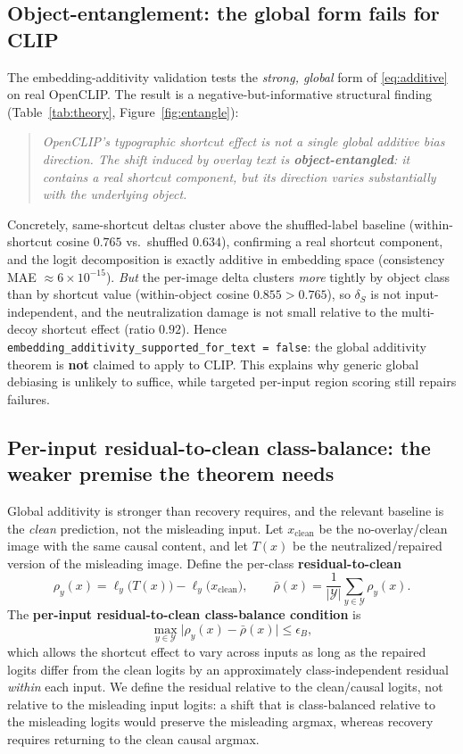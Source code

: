 \documentclass[11pt]{article}
\begin{document}
\subsection{Object-entanglement: the global form fails for CLIP}
The embedding-additivity validation tests the \emph{strong, global} form of
\eqref{eq:additive} on real OpenCLIP. The result is a negative-but-informative
structural finding (Table~\ref{tab:theory}, Figure~\ref{fig:entangle}):
\begin{quote}
\itshape OpenCLIP's typographic shortcut effect is not a single global additive bias
direction. The shift induced by overlay text is \textbf{object-entangled}: it
contains a real shortcut component, but its direction varies substantially with the
underlying object.
\end{quote}
Concretely, same-shortcut deltas cluster above the shuffled-label baseline
(within-shortcut cosine $0.765$ vs.\ shuffled $0.634$), confirming a real shortcut
component, and the logit decomposition is exactly additive in embedding space
(consistency MAE $\approx 6\times10^{-15}$). \emph{But} the per-image delta clusters
\emph{more} tightly by object class than by shortcut value (within-object cosine
$0.855 > 0.765$), so $\delta_S$ is not input-independent, and the neutralization
damage is not small relative to the multi-decoy shortcut effect (ratio $0.92$).
Hence \texttt{embedding\_additivity\_supported\_for\_text = false}: the global
additivity theorem is \textbf{not} claimed to apply to CLIP. This explains why
generic global debiasing is unlikely to suffice, while targeted per-input region
scoring still repairs failures.

\subsection{Per-input residual-to-clean class-balance: the weaker premise the theorem needs}
Global additivity is stronger than recovery requires, and the relevant baseline is
the \emph{clean} prediction, not the misleading input. Let $x_{\mathrm{clean}}$ be
the no-overlay/clean image with the same causal content, and let $T(x)$ be the
neutralized/repaired version of the misleading image. Define the per-class
\textbf{residual-to-clean}
\begin{equation}
\rho_y(x) = \ell_y\big(T(x)\big) - \ell_y\big(x_{\mathrm{clean}}\big),
\qquad
\bar\rho(x) = \frac{1}{|\mathcal{Y}|}\sum_{y\in\mathcal{Y}}\rho_y(x).
\end{equation}
The \textbf{per-input residual-to-clean class-balance condition} is
\begin{equation}
\max_{y\in\mathcal{Y}} \big|\rho_y(x)-\bar\rho(x)\big| \le \epsilon_B,
\end{equation}
which allows the shortcut effect to vary across inputs as long as the repaired
logits differ from the clean logits by an approximately class-independent residual
\emph{within} each input. We define the residual relative to the clean/causal
logits, not relative to the misleading input logits: a shift that is class-balanced
relative to the misleading logits would preserve the misleading argmax, whereas
recovery requires returning to the clean causal argmax.
\end{document}
